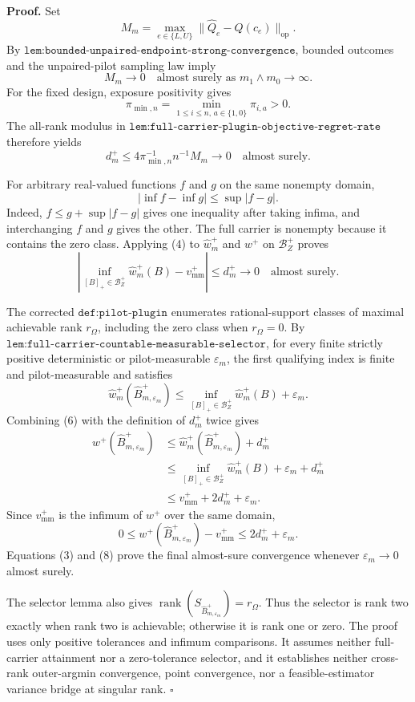 \textbf{Proof.}
Set
\[
M_m=\max_{e\in\{L,U\}}
\lVert\widehat Q_e-Q(c_e)\rVert_{\mathrm{op}}.
\]
By \(\texttt{lem:bounded-unpaired-endpoint-strong-convergence}\), bounded outcomes and the unpaired-pilot sampling law imply
\[
M_m\longrightarrow0
\quad\text{almost surely as }m_1\wedge m_0\to\infty.
\tag{1}
\]
For the fixed design, exposure positivity gives
\[
\pi_{\min,n}=\min_{1\le i\le n,\,a\in\{1,0\}}\pi_{i,a}>0.
\tag{2}
\]
The all-rank modulus in \(\texttt{lem:full-carrier-plugin-objective-regret-rate}\) therefore yields
\[
d_m^+
\le4\pi_{\min,n}^{-1}n^{-1}M_m
\longrightarrow0
\quad\text{almost surely}.
\tag{3}
\]

For arbitrary real-valued functions \(f\) and \(g\) on the same nonempty domain,
\[
|\inf f-\inf g|\le\sup|f-g|.
\tag{4}
\]
Indeed, \(f\le g+\sup|f-g|\) gives one inequality after taking infima, and interchanging \(f\) and \(g\) gives the other.  The full carrier is nonempty because it contains the zero class.  Applying (4) to \(\widehat w_m^+\) and \(w^+\) on \(\mathcal B_Z^+\) proves
\[
\left|
\inf_{[B]_+\in\mathcal B_Z^+}\widehat w_m^+(B)
-v_{\mathrm{mm}}^+
\right|
\le d_m^+\longrightarrow0
\quad\text{almost surely}.
\tag{5}
\]

The corrected \(\texttt{def:pilot-plugin}\) enumerates rational-support classes of maximal achievable rank \(r_\Omega\), including the zero class when \(r_\Omega=0\).  By \(\texttt{lem:full-carrier-countable-measurable-selector}\), for every finite strictly positive deterministic or pilot-measurable \(\varepsilon_m\), the first qualifying index is finite and pilot-measurable and satisfies
\[
\widehat w_m^+(\widehat B_{m,\varepsilon_m}^+)
\le
\inf_{[B]_+\in\mathcal B_Z^+}\widehat w_m^+(B)+\varepsilon_m.
\tag{6}
\]
Combining (6) with the definition of \(d_m^+\) twice gives
\[
\begin{aligned}
w^+(\widehat B_{m,\varepsilon_m}^+)
&\le\widehat w_m^+(\widehat B_{m,\varepsilon_m}^+)+d_m^+\\
&\le\inf_{[B]_+\in\mathcal B_Z^+}\widehat w_m^+(B)
+\varepsilon_m+d_m^+\\
&\le v_{\mathrm{mm}}^++2d_m^++\varepsilon_m.
\end{aligned}
\tag{7}
\]
Since \(v_{\mathrm{mm}}^+\) is the infimum of \(w^+\) over the same domain,
\[
0\le
w^+(\widehat B_{m,\varepsilon_m}^+)-v_{\mathrm{mm}}^+
\le2d_m^++\varepsilon_m.
\tag{8}
\]
Equations (3) and (8) prove the final almost-sure convergence whenever \(\varepsilon_m\to0\) almost surely.

The selector lemma also gives \(\operatorname{rank}(S_{\widehat B_{m,\varepsilon_m}^+})=r_\Omega\).  Thus the selector is rank two exactly when rank two is achievable; otherwise it is rank one or zero.  The proof uses only positive tolerances and infimum comparisons.  It assumes neither full-carrier attainment nor a zero-tolerance selector, and it establishes neither cross-rank outer-argmin convergence, point convergence, nor a feasible-estimator variance bridge at singular rank. \(\square\)